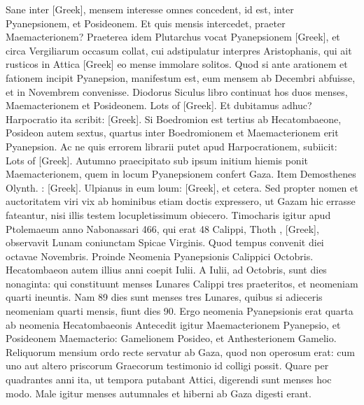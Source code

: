 Sane inter \textgreek{[Greek]},
 mensem interesse omnes concedent,
id est, inter Pyanepsionem, et Posideonem.
Et quis mensis intercedet,
praeter Maemacterionem?
Praeterea idem Plutarchus vocat
Pyanepsionem \textgreek{[Greek]}, et circa Vergiliarum occasum collat,
cui adstipulatur interpres Aristophanis, qui ait rusticos in Attica
 \textgreek{[Greek]}
eo mense immolare solitos.
Quod si ante arationem
et fationem incipit Pyanepsion, manifestum est, eum mensem ab Decembri
abfuisse, et in Novembrem convenisse.
Diodorus Siculus libro
 continuat hos duos menses, Maemacterionem et Posideonem.
\textgreek{Lots of [Greek]}.
Et dubitamus adhuc?
Harpocratio ita scribit: \textgreek{[Greek]}.
Si Boedromion est tertius ab Hecatombaeone,
Posideon autem sextus, quartus inter Boedromionem
et Maemacterionem erit Pyanepsion.
Ac ne quis errorem librarii
putet apud Harpocrationem, subiicit: \textgreek{Lots of [Greek]}.
Autumno praecipitato sub
ipsum initium hiemis ponit Maemacterionem, quem in locum Pyanepsionem
confert Gaza.
Item Demosthenes Olynth. : \textgreek{[Greek]}.
Ulpianus in eum loum: \textgreek{[Greek]},
et cetera.
Sed propter nomen et auctoritatem viri vix ab hominibus
etiam doctis expressero, ut Gazam hic errasse fateantur, nisi
illis testem locupletissimum obiecero.
Timocharis igitur apud Ptolemaeum
anno Nabonassari 466, qui erat 48 Calippi, Thoth ,
\textgreek{[Greek]}, observavit Lunam coniunctam Spicae Virginis.
Quod tempus convenit diei octavae Novembris.
Proinde Neomenia
Pyanepsionis Calippici  Octobris.
Hecatombaeon autem
illius anni coepit  Iulii.
A  Iulii, ad  Octobris, sunt
dies nonaginta: qui constituunt menses Lunares Calippi tres praeteritos,
et neomeniam quarti ineuntis.
Nam 89 dies sunt menses tres
Lunares, quibus si adieceris neomeniam quarti mensis, fiunt dies 90.
Ergo neomenia Pyanepsionis erat quarta ab neomenia Hecatombaeonis
Antecedit igitur Maemacterionem Pyanepsio, et Posideonem
Maemacterio: Gamelionem Posideo, et Anthesterionem Gamelio.
Reliquorum mensium ordo recte servatur ab Gaza, quod non operosum
erat: cum uno aut altero priscorum Graecorum testimonio
id colligi possit.
Quare per quadrantes anni ita, ut tempora putabant
Attici, digerendi sunt menses hoc modo.
Male igitur menses
autumnales et hiberni ab Gaza digesti erant.

